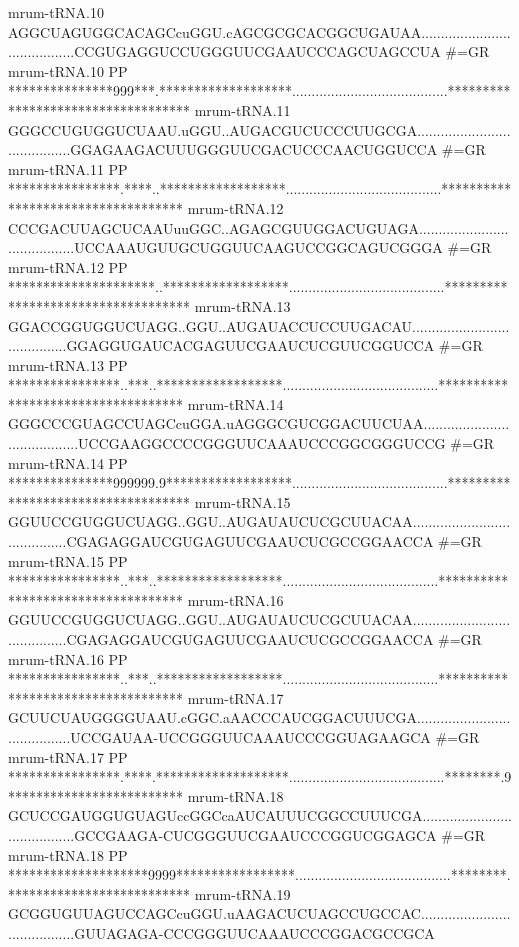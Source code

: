 \begin{sreoutput}
mrum-tRNA.10         AGGCUAGUGGCACAGCcuGGU.cAGCGCGCACGGCUGAUAA........................................CCGUGAGGUCCUGGGUUCGAAUCCCAGCUAGCCUA
#=GR mrum-tRNA.10 PP ***************999***.*******************........................................***********************************
mrum-tRNA.11         GGGCCUGUGGUCUAAU.uGGU..AUGACGUCUCCCUUGCGA........................................GGAGAAGACUUUGGGUUCGACUCCCAACUGGUCCA
#=GR mrum-tRNA.11 PP ****************.****..******************........................................***********************************
mrum-tRNA.12         CCCGACUUAGCUCAAUuuGGC..AGAGCGUUGGACUGUAGA........................................UCCAAAUGUUGCUGGUUCAAGUCCGGCAGUCGGGA
#=GR mrum-tRNA.12 PP *********************..******************........................................***********************************
mrum-tRNA.13         GGACCGGUGGUCUAGG..GGU..AUGAUACCUCCUUGACAU........................................GGAGGUGAUCACGAGUUCGAAUCUCGUUCGGUCCA
#=GR mrum-tRNA.13 PP ****************..***..******************........................................***********************************
mrum-tRNA.14         GGGCCCGUAGCCUAGCcuGGA.uAGGGCGUCGGACUUCUAA........................................UCCGAAGGCCCCGGGUUCAAAUCCCGGCGGGUCCG
#=GR mrum-tRNA.14 PP ***************999999.9******************........................................***********************************
mrum-tRNA.15         GGUUCCGUGGUCUAGG..GGU..AUGAUAUCUCGCUUACAA........................................CGAGAGGAUCGUGAGUUCGAAUCUCGCCGGAACCA
#=GR mrum-tRNA.15 PP ****************..***..******************........................................***********************************
mrum-tRNA.16         GGUUCCGUGGUCUAGG..GGU..AUGAUAUCUCGCUUACAA........................................CGAGAGGAUCGUGAGUUCGAAUCUCGCCGGAACCA
#=GR mrum-tRNA.16 PP ****************..***..******************........................................***********************************
mrum-tRNA.17         GCUUCUAUGGGGUAAU.cGGC.aAACCCAUCGGACUUUCGA........................................UCCGAUAA-UCCGGGUUCAAAUCCCGGUAGAAGCA
#=GR mrum-tRNA.17 PP ****************.****.*******************........................................********.9*************************
mrum-tRNA.18         GCUCCGAUGGUGUAGUccGGCcaAUCAUUUCGGCCUUUCGA........................................GCCGAAGA-CUCGGGUUCGAAUCCCGGUCGGAGCA
#=GR mrum-tRNA.18 PP ********************9999*****************........................................********.**************************
mrum-tRNA.19         GCGGUGUUAGUCCAGCcuGGU.uAAGACUCUAGCCUGCCAC........................................GUUAGAGA-CCCGGGUUCAAAUCCCGGACGCCGCA

\end{sreoutput}
